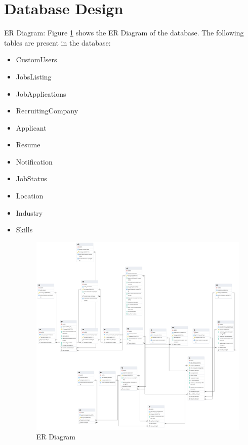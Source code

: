 \documentclass[12pt]{article}
\begin{document}
\section*{Database Design}
ER Diagram: Figure \ref{fig:ER Diagram} shows the ER Diagram of the database.
The following tables are present in the database:
\begin{itemize}
    \item CustomUsers
    \item JobsListing
    \item JobApplications
    \item RecruitingCompany
    \item Applicant
    \item Resume
    \item Notification
    \item JobStatus
    \item Location
    \item Industry
    \item Skills
\begin{figure}[h]
    \centering
    \includegraphics[width=1.0\textwidth]{../images/ERD.png}
    \caption{ER Diagram}
    \label{fig:ER Diagram}
\end{figure}


\end{itemize}
\end{document}

